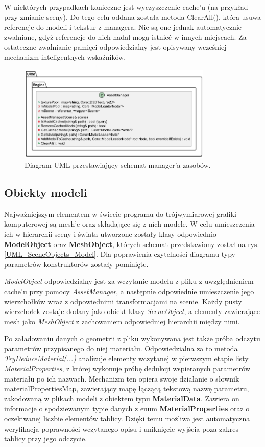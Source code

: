 	W niektórych przypadkach konieczne jest wyczyszczenie cache'u (na przykład przy zmianie sceny). Do tego celu oddana została metoda ClearAll(), która usuwa referencje do modeli i tekstur z managera. Nie są one jednak automatycznie zwalniane, gdyż referencje do nich nadal mogą istnieć w innych miejscach. Za ostateczne zwalnianie pamięci odpowiedzialny jest opisywany wcześniej mechanizm inteligentnych wskaźników.
	
	\begin{figure}[h!]
		\centering
		\includegraphics[width=350px]{images/UML/assets.png}
		\caption{Diagram UML przestawiający schemat manager'a zasobów.}
		\label{UML_AssetManager}
	\end{figure}
	
	
\subsection{Obiekty modeli}
	Najważniejszym elementem w świecie programu do trójwymiarowej grafiki komputerowej są mesh'e oraz składające się z nich modele. W celu umieszczenia ich w hierarchii sceny i świata utworzone zostały klasy odpowiednio \textbf{ModelObject} oraz \textbf{MeshObject}, których schemat przedstawiony został na rys. \ref{UML_SceneObjects_Model}. Dla poprawienia czytelności diagramu typy parametrów konstruktorów zostały pominięte.
	
	\textit{ModelObject} odpowiedzialny jest za wczytanie modelu z pliku z uwzględnieniem cache'u przy pomocy \textit{AssetManager}, a następnie odpowiednie umieszczenie jego wierzchołków wraz z odpowiednimi transformacjami na scenie. Każdy pusty wierzchołek zostaje dodany jako obiekt klasy \textit{SceneObject}, a elementy zawierające mesh jako \textit{MeshObject} z zachowaniem odpowiedniej hierarchii między nimi.
	
	Po załadowaniu danych o geometrii z pliku wykonywana jest także próba odczytu parametrów przypisanego do niej materiału. Odpowiedzialna za to metoda \textit{TryDeduceMaterial(...)} analizuje elementy wczytanej w pierwszym etapie listy \textit{MaterialProperties}, z której wykonuje próbę dedukcji wspieranych parametrów materiału po ich nazwach. Mechanizm ten opiera swoje działanie o słownik materialPropertiesMap, zawierający mapę łączącą tekstową nazwę parametru, zakodowaną w plikach modeli z obiektem typu \textbf{MaterialData}. Zawiera on informacje o spodziewanym typie danych z enum \textbf{MaterialProperties} oraz o oczekiwanej liczbie elementów tablicy. Dzięki temu możliwa jest automatyczna weryfikacja poprawności wczytanego opisu i uniknięcie wyjścia poza zakres tablicy przy jego odczycie.
	
